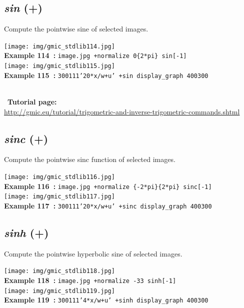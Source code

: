 \documentclass[a4paper,10.5pt,twoside]{book}
\def\comma{\discretionary{,}{}{,}}
\begin{document}
\subsection{\emph{sin} (+)}\vspace*{-0.7em}
Compute the pointwise sine of selected images.
\begin{center}\texttt{[image: img/gmic\_stdlib114.jpg]}\\
{\footnotesize \textbf{Example 114~:} \texttt{image.jpg +normalize 0{\comma}\{2*pi\} sin[-1]}}
\\\texttt{[image: img/gmic\_stdlib115.jpg]}\\
{\footnotesize \textbf{Example 115~:} \texttt{300{\comma}1{\comma}1{\comma}1{\comma}'20*x/w+u' +sin display\_graph 400{\comma}300}}
\end{center}
~\\
~\textbf{Tutorial page: }\\\url{http://gmic.eu/tutorial/trigometric-and-inverse-trigometric-commands.shtml}


\subsection{\emph{sinc} (+)}\vspace*{-0.7em}
Compute the pointwise sinc function of selected images.
\begin{center}\texttt{[image: img/gmic\_stdlib116.jpg]}\\
{\footnotesize \textbf{Example 116~:} \texttt{image.jpg +normalize \{-2*pi\}{\comma}\{2*pi\} sinc[-1]}}
\\\texttt{[image: img/gmic\_stdlib117.jpg]}\\
{\footnotesize \textbf{Example 117~:} \texttt{300{\comma}1{\comma}1{\comma}1{\comma}'20*x/w+u' +sinc display\_graph 400{\comma}300}}
\end{center}

\subsection{\emph{sinh} (+)}\vspace*{-0.7em}
Compute the pointwise hyperbolic sine of selected images.
\begin{center}\texttt{[image: img/gmic\_stdlib118.jpg]}\\
{\footnotesize \textbf{Example 118~:} \texttt{image.jpg +normalize -3{\comma}3 sinh[-1]}}
\\\texttt{[image: img/gmic\_stdlib119.jpg]}\\
{\footnotesize \textbf{Example 119~:} \texttt{300{\comma}1{\comma}1{\comma}1{\comma}'4*x/w+u' +sinh display\_graph 400{\comma}300}}
\end{center}
\end{document}

